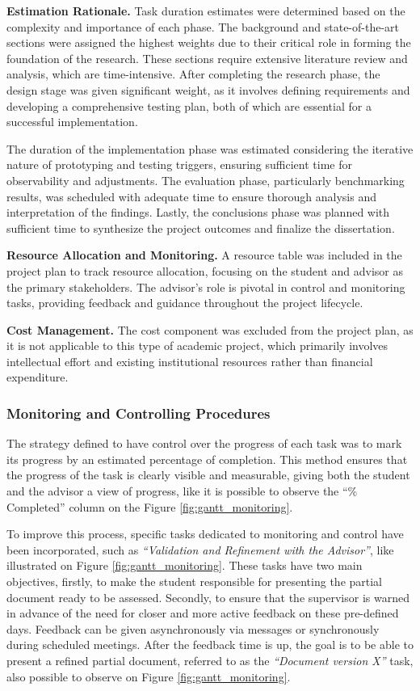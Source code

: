 \textbf{Estimation Rationale.} Task duration estimates were determined based on the complexity and importance of each phase. The background and state-of-the-art sections were assigned the highest weights due to their critical role in forming the foundation of the research. These sections require extensive literature review and analysis, which are time-intensive. After completing the research phase, the design stage was given significant weight, as it involves defining requirements and developing a comprehensive testing plan, both of which are essential for a successful implementation.

The duration of the implementation phase was estimated considering the iterative nature of prototyping and testing triggers, ensuring sufficient time for observability and adjustments. The evaluation phase, particularly benchmarking results, was scheduled with adequate time to ensure thorough analysis and interpretation of the findings. Lastly, the conclusions phase was planned with sufficient time to synthesize the project outcomes and finalize the dissertation.

\textbf{Resource Allocation and Monitoring.} A resource table was included in the project plan to track resource allocation, focusing on the student and advisor as the primary stakeholders. The advisor’s role is pivotal in control and monitoring tasks, providing feedback and guidance throughout the project lifecycle.

\textbf{Cost Management.} The cost component was excluded from the project plan, as it is not applicable to this type of academic project, which primarily involves intellectual effort and existing institutional resources rather than financial expenditure.

\subsubsection{Monitoring and Controlling Procedures}

The strategy defined to have control over the progress of each task was to mark its progress by an estimated percentage of completion. This method ensures that the progress of the task is clearly visible and measurable, giving both the student and the advisor a view of progress, like it is possible to observe the “\% Completed” column on the Figure \ref{fig:gantt_monitoring}.

To improve this process, specific tasks dedicated to monitoring and control have been incorporated, such as \textit{“Validation and Refinement with the Advisor”}, like illustrated on Figure \ref{fig:gantt_monitoring}. These tasks have two main objectives, firstly, to make the student responsible for presenting the partial document ready to be assessed. Secondly, to ensure that the supervisor is warned in advance of the need for closer and more active feedback on these pre-defined days. Feedback can be given asynchronously via messages or synchronously during scheduled meetings. After the feedback time is up, the goal is to be able to present a refined partial document, referred to as the \textit{“Document version X”} task, also possible to observe on Figure \ref{fig:gantt_monitoring}.

